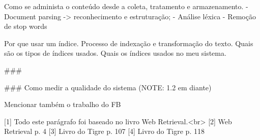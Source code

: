 Como se administa o conteúdo desde a coleta, tratamento e armazenamento.
- Document parsing -> reconhecimento e estruturação;
- Análise léxica
- Remoção de stop words


Por que usar um índice.
Processo de indexação e transformação do texto.
Quais são os tipos de índices usados.
Quais os índices usados no meu sistema.

### 

### Como medir a qualidade do sistema (NOTE: 1.2 em diante)

Mencionar também o trabalho do FB


[1] Todo este parágrafo foi baseado no livro Web Retrieval.<br>
[2] Web Retrieval p. 4
[3] Livro do Tigre p. 107
[4] Livro do Tigre p. 118
